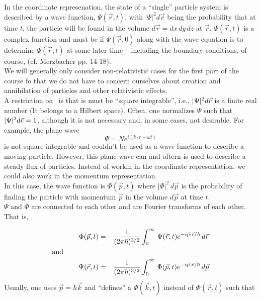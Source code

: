  In the coordinate represenation, the state of a ``single'' particle system is described by a wave function, $\Psi(\vec{r},t)$, with $|\Psi|^2 d\vec{r}$ being
 the probability that at time $t$, the particle will be found in the volume $d\vec{r} = dx\,dy\,dz$ at $\vec{r}$. $\Psi(\vec{r},t)$ is a complex function
 and must be if $\Psi(\vec{r},0)$ along with the wave equation is to determine $\Psi(\vec{r},t)$ at some later time -- including the boundary conditions, 
 of course, (cf. Merzbacher pp. 14-18).\\

We will generally only consider non-relativistic cases for the first part of the course fo that we do not have to concern ourselves about creation
and annihilation of particles and other relativistic effects.\\

A restriction on \Wftn\ is that is must be ``square integrable'', i.e., $|\Psi|^2 d\vec{r}$ is a finite real number (It belongs to a Hilbert space). Often, one normalizes
$\Psi$ such that $|\Psi|^2 d\vec{r} = 1$, although it is not necessary and, in some cases, not desirable. For example, the plane wave
$$\Psi = N e^{i(k\cdot r - \omega t)}$$ is not square integrable and couldn't be used as a wave function to describe a moving particle. However, this
plane wave can and oftern is used to describe a steady flux of particles. Instead of workin in the coordinate representation. we could also work in the momentum
representation.\\

In this case, the wave function is $\Phi(\vec{p},t)$ where $|\Phi|^2\, d\vec{p}$ is the probability of finding the particle with momentum $\vec{p}$ in the volume
$d\vec{p}$ at time $t$. \\

$\Psi$ and $\Phi$ are connected to each other and are Fourier transforms of each other. That is, 

 \begin{eqnarray*}
  \Phi(\vec{p},t) &=& {1\over (2\pi\hbar)^{3/2}} \int_0^\infty \, \Psi(\vec{r},t)e^{-i\vec{p}\cdot\vec{r}/\hbar}\, d\vec{r} \\ 
  \hbox{and~~~~~~~~~~~~~~~\hfill} &\null&\\
  \Psi(\vec{r},t) &=& {1\over (2\pi\hbar)^{3/2}} \int_0^\infty \, \Phi(\vec{p},t)e^{-i\vec{p}\cdot\vec{r}/\hbar}\, d\vec{p} 
 \end{eqnarray*}Usually, one uses $\vec{p} = \hbar\vec{k}$ and ``defines'' a $\Phi(\vec{k},t)$ instead of $\Phi(\vec{r},t)$ such that 
  
